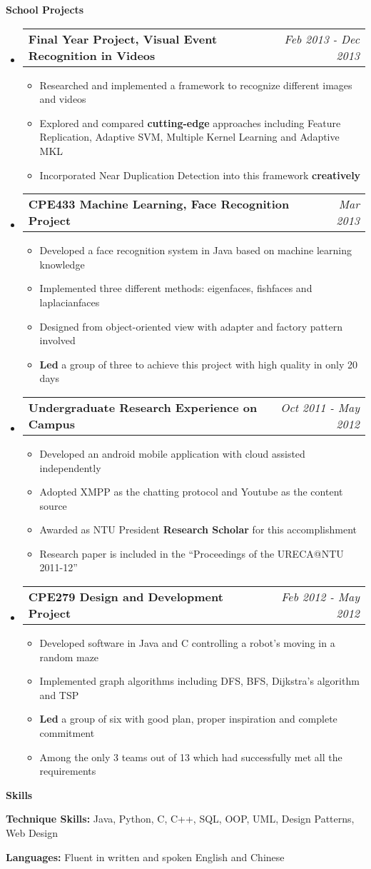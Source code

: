 \documentclass[a4paper,12pt]{article}
\makeatletter
\newcommand{\resitem}[1]{\item #1 \vspace{-2pt}}
\newcommand{\resheading}[1]{{\large {\begin{minipage}{\textwidth}{\textbf{#1 \vphantom{p\^{E}}}}\end{minipage}}}}
\newcommand{\projectsubheading}[2]{
\begin{tabular*}{6.3in}{l@{\extracolsep{\fill}}r}
		\textbf{#1} & \textit{#2} \\
\end{tabular*}\vspace{-6pt}}
\makeatother
\begin{document}
\resheading {School Projects}
\begin{itemize}
\item
	\projectsubheading {Final Year Project, Visual Event Recognition in Videos}{Feb 2013 - Dec 2013}
	\begin{itemize}
		\resitem {Researched and implemented a framework to recognize different images and videos}
		\resitem {Explored and compared \textbf{cutting-edge} approaches including Feature Replication, Adaptive SVM, Multiple Kernel Learning and Adaptive MKL}
		\resitem {Incorporated Near Duplication Detection into this framework \textbf{creatively}}

	\end{itemize}

\item
	\projectsubheading {CPE433 Machine Learning, Face Recognition Project}{Mar 2013}
	\begin{itemize}
		\resitem {Developed a face recognition system in Java based on machine learning knowledge}
		\resitem {Implemented three different methods: eigenfaces, fishfaces and laplacianfaces}
		\resitem {Designed from object-oriented view with adapter and factory pattern involved}
		\resitem {\textbf{Led} a group of three to achieve this project with high quality in only 20 days}
	\end{itemize}
\item
	\projectsubheading {Undergraduate Research Experience on Campus} {Oct 2011 - May 2012}

	\begin{itemize}
		\resitem {Developed an android mobile application with cloud assisted independently}
		\resitem {Adopted XMPP as the chatting protocol and Youtube as the content source}
		\resitem {Awarded as NTU President \textbf{Research Scholar} for this accomplishment}
		\resitem{ Research paper is included in the ``Proceedings of the URECA@NTU 2011-12''}
	\end{itemize}
\item
	\projectsubheading {CPE279 Design and Development Project}{Feb 2012 - May 2012}

	\begin{itemize}
		\resitem {Developed software in Java and C controlling a robot's moving in a random maze}
		\resitem {Implemented graph algorithms including DFS, BFS, Dijkstra's algorithm and TSP}
		\resitem {\textbf{Led} a group of six with good plan, proper inspiration and complete commitment}
		\resitem {Among the only 3 teams out of 13 which had successfully met all the requirements}
	\end{itemize}
\end{itemize}

\resheading{Skills}
\begin{description}
\item{\bf Technique Skills: }Java, Python, C, C++, SQL, OOP, UML, Design Patterns, Web Design

\item{\bf Languages: }Fluent in written and spoken English and Chinese
\end{description}
\end{document}
